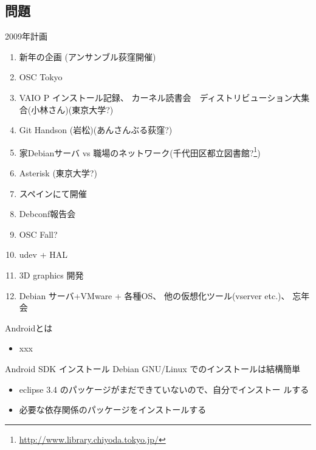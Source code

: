 \subsection{問題}


\begin{frame}{2009年計画}

{\scriptsize
 \begin{enumerate}
  \item 新年の企画 (アンサンブル荻窪開催)
  \item OSC Tokyo
  \item VAIO P インストール記録、
	カーネル読書会　ディストリビューション大集合(小林さん)(東京大学?)
  \item Git Handson (岩松)(あんさんぶる荻窪?)
  \item 家Debianサーバ vs 職場のネットワーク(千代田区都立図書館?\footnote{\url{http://www.library.chiyoda.tokyo.jp/}})
  \item Asterisk (東京大学?)
  \item スペインにて開催
  \item Debconf報告会
  \item OSC Fall?
  \item udev + HAL
  \item 3D graphics 開発 
  \item Debian サーバ+VMware + 各種OS、
	他の仮想化ツール(vserver etc.)、
	忘年会
 \end{enumerate}
}
\end{frame}




\begin{frame}{Androidとは}
\begin{itemize}
 \item xxx
\end{itemize}
\end{frame}

\begin{frame}{Android SDK インストール}
Debian GNU/Linux でのインストールは結構簡単
\begin{itemize}
 \item eclipse 3.4 のパッケージがまだできていないので、自分でインストー
       ルする
 \item 必要な依存関係のパッケージをインストールする
\end{itemize}
\end{frame}


